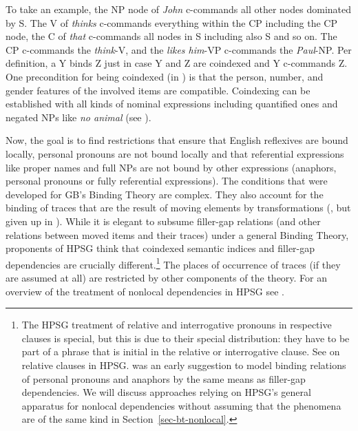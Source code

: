 \documentclass[output=paper
 	        ,biblatex
                ,babelshorthands
                ,newtxmath
                ,draftmode
                ,colorlinks, citecolor=brown
]{langscibook}
\begin{document}
To take an example, the NP node of \emph{John} c-commands all other nodes dominated by S. The V of
\emph{thinks} c-commands everything within the CP including the CP node, the C of \emph{that}
c-commands all nodes in S including also S and so on. The CP c-commands the \emph{think}-V, and the
\emph{likes him}-VP c-commands the \emph{Paul}-NP. Per definition, a Y binds Z just in case Y and Z
are coindexed and Y c-commands Z. One precondition for being coindexed (in ) is that the
person, number, and gender features of the involved items are compatible. Coindexing can be
established with all kinds of nominal expressions including quantified ones and negated NPs like
\emph{no animal} (see \citealp[--129]{BP80a}).

Now, the goal is to find restrictions that ensure that English reflexives are bound locally, personal
pronouns are not bound locally and that referential expressions like proper names and full NPs are
not bound by other expressions (anaphors, personal pronouns or fully referential expressions). The conditions that were developed for
GB's Binding Theory are complex. They also account for the binding of traces that are the result of
moving elements by transformations (\citealp{Chomsky81a}, but given up in
\citealp{Chomsky86a}).\label{page-traces-binding} While it is elegant to subsume filler-gap relations (and other relations
between moved items and their traces) under a general Binding Theory, proponents of HPSG think that
coindexed semantic indices and filler-gap
dependencies are crucially different.\footnote{\label{binding-fn-percolation-of-indices}%
The HPSG treatment of relative and interrogative pronouns in respective clauses is special, but this
is due to their special distribution: they have to be part of a phrase that is initial in the
relative or interrogative clause. 
See  on relative
clauses in HPSG. %
 was an early suggestion to model binding relations of personal pronouns and anaphors by
the same means as filler-gap dependencies. We will discuss approaches relying on HPSG's general apparatus
for nonlocal dependencies without assuming that the phenomena are of the same kind in Section~\ref{sec-bt-nonlocal}. 
} The places of occurrence of traces (if they are assumed at all)
are restricted by other components of the theory. For an overview of the treatment of nonlocal
dependencies in HPSG see .
\end{document}
